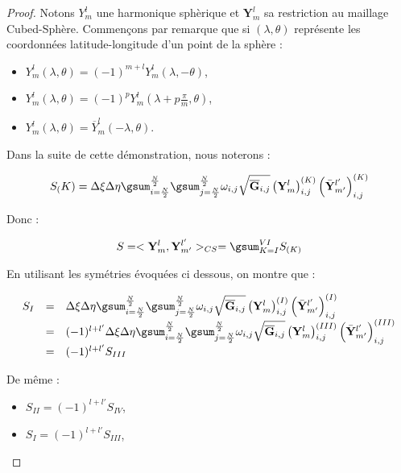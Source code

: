 \begin{proof}
Notons $Y_m^l$ une harmonique sphèrique et $\mathbf{Y}_m^l$ sa restriction au maillage Cubed-Sphère.
Commençons par remarque que si $(\lambda, \theta)$ représente les coordonnées latitude-longitude d'un point de la sphère :
\begin{itemize}
\item $Y_m^l (\lambda, \theta) = (-1)^{m+l} Y_m^l (\lambda, - \theta)$, 
\item $Y_m^l(\lambda, \theta) = (-1)^p Y_m^l \left( \lambda + p \frac{\pi}{m}, \theta \right)$,
\item $Y_m^l(\lambda,\theta)=\overline{Y}_m^l(-\lambda,\theta)$.
\end{itemize}

Dans la suite de cette démonstration, nous noterons :

$$
S_(K) = \Delta \xi \Delta \eta \gsum_{i = \frac{N}{2}}^{\frac{N}{2}} \gsum_{j = \frac{N}{2}}^{\frac{N}{2}} \omega_{i,j} \sqrt{\overline{\mathbf{G}}_{i,j}} \left(\mathbf{Y}_m^l\right)_{i,j}^{(K)} \left(\bar{\mathbf{Y}}_{m'}^{l'}\right)_{i,j}^{(K)}
$$

Donc :

$$
S=<\mathbf{Y}_m^l,\mathbf{Y}_{m'}^{l'}>_{CS} = \gsum_{K=I}^{VI} S_{(K)}
$$

En utilisant les symétries évoquées ci dessous, on montre que :

\begin{equation*}
\begin{array}{rcl}
S_I & = & \Delta \xi \Delta \eta \gsum_{i = \frac{N}{2}}^{\frac{N}{2}} \gsum_{j = \frac{N}{2}}^{\frac{N}{2}} \omega_{i,j} \sqrt{\overline{\mathbf{G}}_{i,j}} \left(\mathbf{Y}_m^l\right)_{i,j}^{(I)} \left(\bar{\mathbf{Y}}_{m'}^{l'}\right)_{i,j}^{(I)} \\
& = & (-1)^{l+l'} \Delta \xi \Delta \eta \gsum_{i = \frac{N}{2}}^{\frac{N}{2}} \gsum_{j = \frac{N}{2}}^{\frac{N}{2}} \omega_{i,j} \sqrt{\overline{\mathbf{G}}_{i,j}} \left(\mathbf{Y}_m^l\right)_{i,j}^{(III)} \left(\bar{\mathbf{Y}}_{m'}^{l'}\right)_{i,j}^{(III)} \\
& = & (-1)^{l+l'} S_{III}
\end{array}
\end{equation*}

De même :

\begin{itemize}
\item $S_{II} = (-1)^{l+l'} S_{IV}$,
\item $S_{I} = (-1)^{l+l'} S_{III}$,
\end{itemize}


\end{proof}
